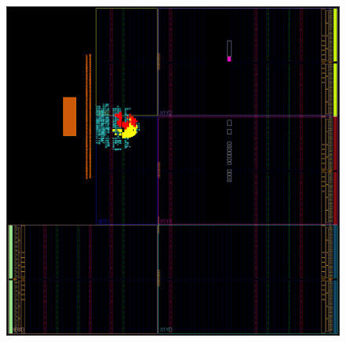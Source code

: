 \documentclass[a4paper,12pt,twoside]{article}
\begin{document}
\begin{enumerate}
\begin{figure}[H]
        \includegraphics[width=\textwidth]{images/3.png}
    \end{figure}
\end{enumerate}
\end{document}
